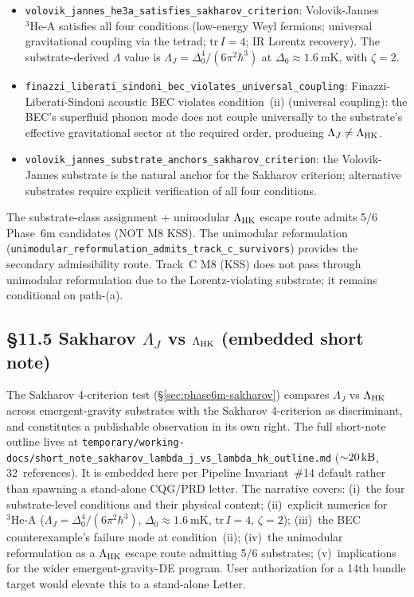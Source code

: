 \documentclass[aps,prd,reprint,nofootinbib,superscriptaddress]{revtex4-2}
\begin{document}
\begin{itemize}
\item \texttt{volovik\_jannes\_he3a\_satisfies\_sakharov\_criterion}:
  Volovik-Jannes ${}^3\!\text{He-A}$ satisfies all four conditions
  (low-energy Weyl fermions; universal gravitational coupling via
  the tetrad; $\text{tr}\, I = 4$; IR Lorentz recovery). The
  substrate-derived $\Lambda$ value is
  $\Lambda_J = \Delta_0^4 / (6\pi^2 \hbar^3)$ at
  $\Delta_0 \approx \SI{1.6}{\milli\kelvin}$, with $\zeta = 2$.
\item \texttt{finazzi\_liberati\_sindoni\_bec\_violates\_universal\_coupling}:
  Finazzi-Liberati-Sindoni acoustic BEC violates condition~(ii) (universal
  coupling): the BEC's superfluid phonon mode does not couple
  universally to the substrate's effective gravitational sector at the
  required order, producing $\Lambda_J \neq \Lambda_{\rm HK}$.
\item \texttt{volovik\_jannes\_substrate\_anchors\_sakharov\_criterion}:
  the Volovik-Jannes substrate is the natural anchor for the Sakharov
  criterion; alternative substrates require explicit verification of
  all four conditions.
\end{itemize}

The substrate-class assignment + unimodular $\Lambda_{\rm HK}$ escape
route admits 5/6 Phase~6m candidates (NOT M8 KSS). The unimodular
reformulation
(\texttt{unimodular\_reformulation\_admits\_track\_c\_survivors}) provides
the secondary admissibility route. Track~C M8 (KSS) does not pass
through unimodular reformulation due to the Lorentz-violating
substrate; it remains conditional on path-(a).

\subsection*{§11.5 Sakharov $\Lambda_J$ vs $\Lambda_{\rm HK}$ (embedded short note)}
\label{subsec:sakharov-short-note}

The Sakharov 4-criterion test (§\ref{sec:phase6m-sakharov}) compares
$\Lambda_J$ vs $\Lambda_{\rm HK}$ across emergent-gravity substrates
with the Sakharov 4-criterion as discriminant, and constitutes a
publishable observation in its own right. The full
short-note outline lives at
\texttt{temporary/working-docs/short\_note\_sakharov\_lambda\_j\_vs\_lambda\_hk\_outline.md}
(${\sim}\SI{20}{\kilo\byte}$, 32~references). It is embedded here per
Pipeline Invariant~\#14 default rather than spawning a stand-alone
CQG/PRD letter. The narrative covers: (i)~the four substrate-level
conditions and their physical content; (ii)~explicit numerics for
${}^3\!\text{He-A}$ ($\Lambda_J = \Delta_0^4 / (6\pi^2 \hbar^3)$,
$\Delta_0 \approx \SI{1.6}{\milli\kelvin}$, $\text{tr}\, I = 4$,
$\zeta = 2$); (iii)~the BEC counterexample's failure mode at
condition~(ii); (iv)~the unimodular reformulation as a $\Lambda_{\rm HK}$
escape route admitting 5/6 substrates; (v)~implications for the wider
emergent-gravity-DE program. User authorization for a 14th bundle
target would elevate this to a stand-alone Letter.
\end{document}
